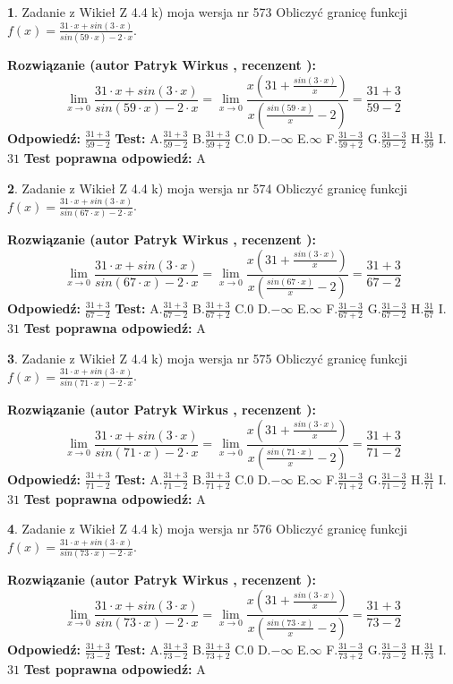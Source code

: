 \documentclass[12pt, a4paper]{article}
\theoremstyle{definition} %
\newtheorem{zad}{}
\newcommand{\zadStart}[1]{\begin{zad}#1\newline}
\newcommand{\zadStop}{\end{zad}}
\newcommand{\rozwStart}[2]{\noindent \textbf{Rozwiązanie (autor #1 , recenzent #2): }\newline}
\newcommand{\rozwStop}{\newline}
\newcommand{\odpStart}{\noindent \textbf{Odpowiedź:}\newline}
\newcommand{\odpStop}{\newline}
\newcommand{\testStart}{\noindent \textbf{Test:}\newline}
\newcommand{\testStop}{\newline}
\newcommand{\kluczStart}{\noindent \textbf{Test poprawna odpowiedź:}\newline}
\newcommand{\kluczStop}{\newline}
\begin{document}
\zadStart{Zadanie z Wikieł Z 4.4 k) moja wersja nr 573}
Obliczyć granicę funkcji $f(x)=\frac{31\cdot x +sin(3\cdot x)}{sin(59\cdot x) -2\cdot x}$.
\zadStop
\rozwStart{Patryk Wirkus}{}
$$\lim\limits_{x\to 0}\frac{31\cdot x +sin(3\cdot x)}{sin(59\cdot x) -2\cdot x}
=\lim\limits_{x\to 0}\frac{x(31+\frac{sin(3\cdot x)}{x})}{x(\frac{sin(59\cdot x)}{x}-2)}
=\frac{31+3}{59-2}$$
\rozwStop
\odpStart
$\frac{31+3}{59-2}$
\odpStop
\testStart
A.$\frac{31+3}{59-2}$
B.$\frac{31+3}{59+2}$
C.$0$
D.$-\infty$
E.$\infty$
F.$\frac{31-3}{59+2}$
G.$\frac{31-3}{59-2}$
H.$\frac{31}{59}$
I.$31$
\testStop
\kluczStart
A
\kluczStop



\zadStart{Zadanie z Wikieł Z 4.4 k) moja wersja nr 574}
Obliczyć granicę funkcji $f(x)=\frac{31\cdot x +sin(3\cdot x)}{sin(67\cdot x) -2\cdot x}$.
\zadStop
\rozwStart{Patryk Wirkus}{}
$$\lim\limits_{x\to 0}\frac{31\cdot x +sin(3\cdot x)}{sin(67\cdot x) -2\cdot x}
=\lim\limits_{x\to 0}\frac{x(31+\frac{sin(3\cdot x)}{x})}{x(\frac{sin(67\cdot x)}{x}-2)}
=\frac{31+3}{67-2}$$
\rozwStop
\odpStart
$\frac{31+3}{67-2}$
\odpStop
\testStart
A.$\frac{31+3}{67-2}$
B.$\frac{31+3}{67+2}$
C.$0$
D.$-\infty$
E.$\infty$
F.$\frac{31-3}{67+2}$
G.$\frac{31-3}{67-2}$
H.$\frac{31}{67}$
I.$31$
\testStop
\kluczStart
A
\kluczStop



\zadStart{Zadanie z Wikieł Z 4.4 k) moja wersja nr 575}
Obliczyć granicę funkcji $f(x)=\frac{31\cdot x +sin(3\cdot x)}{sin(71\cdot x) -2\cdot x}$.
\zadStop
\rozwStart{Patryk Wirkus}{}
$$\lim\limits_{x\to 0}\frac{31\cdot x +sin(3\cdot x)}{sin(71\cdot x) -2\cdot x}
=\lim\limits_{x\to 0}\frac{x(31+\frac{sin(3\cdot x)}{x})}{x(\frac{sin(71\cdot x)}{x}-2)}
=\frac{31+3}{71-2}$$
\rozwStop
\odpStart
$\frac{31+3}{71-2}$
\odpStop
\testStart
A.$\frac{31+3}{71-2}$
B.$\frac{31+3}{71+2}$
C.$0$
D.$-\infty$
E.$\infty$
F.$\frac{31-3}{71+2}$
G.$\frac{31-3}{71-2}$
H.$\frac{31}{71}$
I.$31$
\testStop
\kluczStart
A
\kluczStop



\zadStart{Zadanie z Wikieł Z 4.4 k) moja wersja nr 576}
Obliczyć granicę funkcji $f(x)=\frac{31\cdot x +sin(3\cdot x)}{sin(73\cdot x) -2\cdot x}$.
\zadStop
\rozwStart{Patryk Wirkus}{}
$$\lim\limits_{x\to 0}\frac{31\cdot x +sin(3\cdot x)}{sin(73\cdot x) -2\cdot x}
=\lim\limits_{x\to 0}\frac{x(31+\frac{sin(3\cdot x)}{x})}{x(\frac{sin(73\cdot x)}{x}-2)}
=\frac{31+3}{73-2}$$
\rozwStop
\odpStart
$\frac{31+3}{73-2}$
\odpStop
\testStart
A.$\frac{31+3}{73-2}$
B.$\frac{31+3}{73+2}$
C.$0$
D.$-\infty$
E.$\infty$
F.$\frac{31-3}{73+2}$
G.$\frac{31-3}{73-2}$
H.$\frac{31}{73}$
I.$31$
\testStop
\kluczStart
A
\kluczStop
\end{document}
